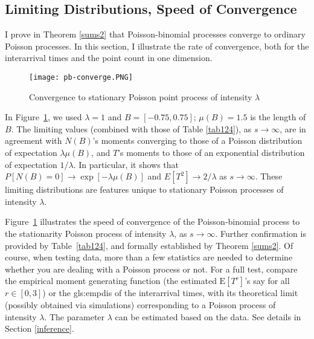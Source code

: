 \documentclass[10pt]{article}
\begin{document}
\subsection{Limiting Distributions, Speed of Convergence}\label{convpoisson}

I prove in Theorem \ref{sums2} that Poisson-binomial processes converge to ordinary Poisson processes. In this section, I illustrate the rate of convergence, both for the interarrival times and the point count in one dimension. 

\begin{figure}[H]
\centering
\texttt{[image: pb-converge.PNG]}
\caption{Convergence to stationary Poisson point process of intensity $\lambda$}
\label{fig:pbconverge}
\end{figure}
In Figure~\ref{fig:pbconverge}, we used $\lambda=1$ and $B=[-0.75, 0.75]$; $\mu(B)=1.5$ is the length of $B$. The limiting values (combined with those of Table \ref{tab124}), as $s\rightarrow\infty$, are in agreement with $N(B)$'s moments converging to those of a Poisson distribution of expectation $\lambda\mu(B)$, and $T$'s moments to those of an exponential distribution of expectation $1/\lambda$. 
In particular, it shows that $P[N(B)=0]\rightarrow\exp[-\lambda\mu(B)]$ and $E[T^2]\rightarrow 2/\lambda$  as $s\rightarrow\infty$.  
These limiting distributions are features unique to stationary Poisson processes of intensity $\lambda$.

Figure~\ref{fig:pbconverge} illustrates the speed of convergence of the Poisson-binomial process to the stationarity Poisson process of intensity $\lambda$, as $s\rightarrow\infty$. Further confirmation is provided by Table~\ref{tab124}, and formally established by Theorem \ref{sums2}. Of course, when testing data, more than a few statistics are needed to determine whether you are dealing with a Poisson process or not. For a full test, compare the empirical \textcolor{index}{moment generating function} (the estimated $\mbox{E}[T^r]$'s say for all $r\in[0,3]$) or the \gls{gls:empdis} of the interarrival times, with its theoretical limit (possibly obtained via simulations) corresponding to a Poisson process of intensity $\lambda$. The parameter $\lambda$ can be estimated based on the data. See details in Section \ref{inference}.
\end{document}

